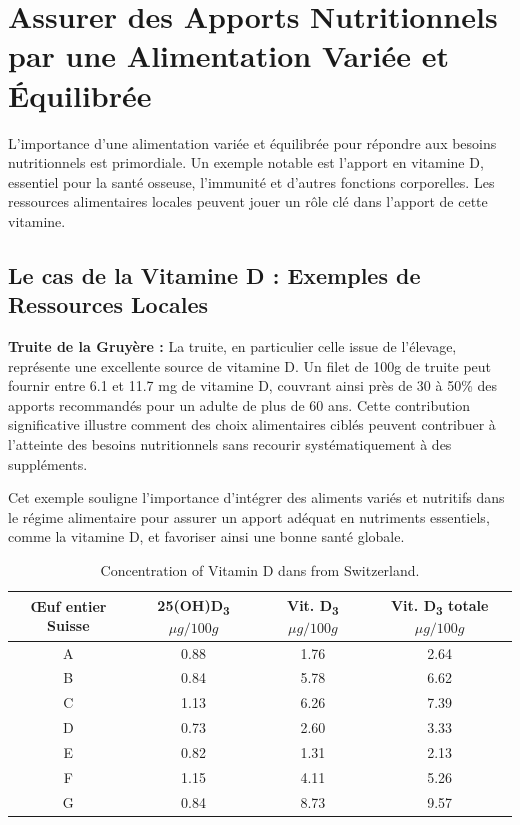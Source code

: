 \documentclass[11pt]{article}
\begin{document}
\section{Assurer des Apports Nutritionnels par une Alimentation Variée et Équilibrée}

L'importance d'une alimentation variée et équilibrée pour répondre aux besoins nutritionnels est primordiale. Un exemple notable est l'apport en vitamine D, essentiel pour la santé osseuse, l'immunité et d'autres fonctions corporelles. Les ressources alimentaires locales peuvent jouer un rôle clé dans l'apport de cette vitamine.

\subsection{Le cas de la Vitamine D : Exemples de Ressources Locales}

\textbf{Truite de la Gruyère :}
La truite, en particulier celle issue de l'élevage, représente une excellente source de vitamine D. Un filet de 100g de truite peut fournir entre 6.1 et 11.7 mg de vitamine D, couvrant ainsi près de 30 à 50\% des apports recommandés pour un adulte de plus de 60 ans. Cette contribution significative illustre comment des choix alimentaires ciblés peuvent contribuer à l'atteinte des besoins nutritionnels sans recourir systématiquement à des suppléments.

Cet exemple souligne l'importance d'intégrer des aliments variés et nutritifs dans le régime alimentaire pour assurer un apport adéquat en nutriments essentiels, comme la vitamine D, et favoriser ainsi une bonne santé globale.

\begin{table}[h!]
    \centering
    \begin{tabular}{|c|c|c|c|}
    \hline
    Œuf entier Suisse & 25(OH)D\textsubscript{3} $\mu g/100g$ & Vit. D\textsubscript{3} $\mu g/100g$ & Vit. D\textsubscript{3} totale $\mu g/100g$ \\
    \hline
    A & 0.88 & 1.76 & 2.64 \\
    B & 0.84 & 5.78 & 6.62 \\
    C & 1.13 & 6.26 & 7.39 \\
    D & 0.73 & 2.60 & 3.33 \\
    E & 0.82 & 1.31 & 2.13 \\
    F & 1.15 & 4.11 & 5.26 \\
    G & 0.84 & 8.73 & 9.57 \\
    \hline
    \end{tabular}
    \caption{Concentration of Vitamin D dans from Switzerland.}
    \label{table:vitd_eggs}
    \end{table}
\end{document}
